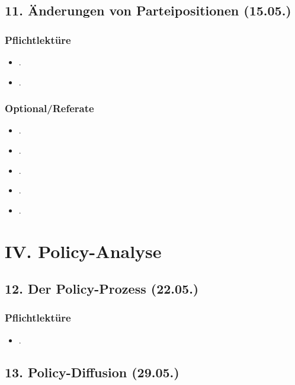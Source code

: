 \documentclass[abstract=on,parskip=full,headings=standardclasses,fontsize=11pt,paper=a4]{scrartcl}
\begin{document}
\subsection{11. Änderungen von Parteipositionen (15.05.)}

\subsubsection*{Pflichtlektüre}
\begin{itemize}
\item {}.
\item {}.
\end{itemize}



\subsubsection*{Optional/Referate}
\begin{itemize}
\item {}.
\item {}.
\item {}.
\item {}.
\item {}.
\end{itemize}



\section{IV. Policy-Analyse}

\subsection{12. Der Policy-Prozess (22.05.)}

\subsubsection*{Pflichtlektüre}
\begin{itemize}
\item {}.
\end{itemize}
 


\subsection{13. Policy-Diffusion (29.05.)}
\end{document}
